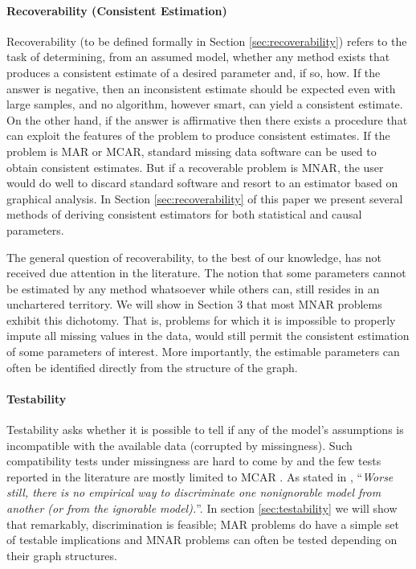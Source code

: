 \documentclass[12pt]{article}
\begin{document}
\paragraph{Recoverability (Consistent Estimation)}
Recoverability (to be defined formally in Section \ref{sec:recoverability}) refers
to the task of determining, from an assumed model,
whether any method exists that produces a consistent
estimate of a desired parameter and, if so, how.
If the answer is negative, then an inconsistent estimate
should be expected even with large samples, and no algorithm,
however smart, can yield a consistent estimate.
On the other hand, if the answer  is affirmative
then there exists a procedure that can exploit the
features of the problem to produce consistent estimates.
If the problem is MAR or MCAR, standard missing data software can be used to obtain
consistent estimates. But if a recoverable problem is MNAR,
the user would do well to discard standard software and
resort to an estimator based on graphical analysis.
In Section \ref{sec:recoverability} of this paper we present
several methods of deriving consistent estimators for both statistical and causal parameters.

The general question of recoverability, to the best
of our knowledge, has not received due attention in the literature.
The notion that some parameters cannot be
estimated by any method whatsoever while others can,
still resides in an unchartered territory.
We will show in Section 3 that most MNAR problems
exhibit this dichotomy. That is, problems for which it is impossible
to properly impute all missing values in the data, would still
permit the consistent estimation of some parameters
of interest.  More importantly, the estimable parameters can often be identified directly
from the structure of the graph.


\paragraph{Testability}
Testability asks whether it is possible to tell
if any of the model's assumptions is incompatible with the
available data (corrupted by missingness).
Such compatibility tests under missingness are hard to come by and the
few tests reported in the literature are mostly 
limited to  MCAR \citep{little1988test}. As stated in \cite{allison2003missing}, 
``\textit{Worse still, there is no empirical way to discriminate one nonignorable model from another (or from the ignorable model).}''. In section
\ref{sec:testability} we will show that remarkably, discrimination is feasible; MAR problems do have a simple set of testable implications and MNAR problems can often be tested depending on their graph structures. 
\end{document}
